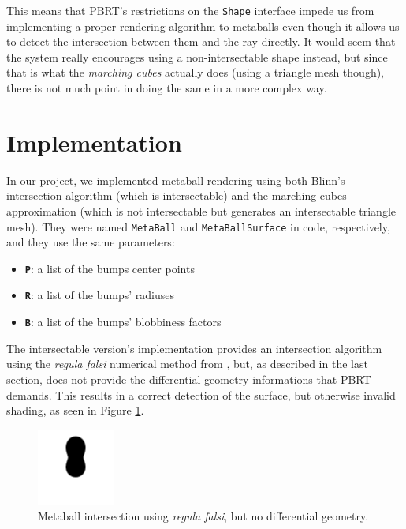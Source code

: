 \documentclass[conference]{acmsiggraph}
\begin{document}
This means that PBRT's restrictions on the \texttt{Shape} interface impede us
from implementing a proper rendering algorithm to metaballs even though it
allows us to detect the intersection between them and the ray directly. It would
seem that the system really encourages using a non-intersectable shape instead,
but since that is what the \textit{marching cubes} actually does (using a
triangle mesh though), there is not much point in doing the same in a more
complex way.

\section{Implementation}

In our project, we implemented metaball rendering using both Blinn's
intersection algorithm (which is intersectable) and the marching cubes
approximation (which is not intersectable but generates an intersectable 
triangle mesh). They were named \texttt{MetaBall} and \texttt{MetaBallSurface} 
in code, respectively, and they use the same parameters:

\begin{itemize}
  \item \textbf{\texttt{P}}: a list of the bumps center points
  \item \textbf{\texttt{R}}: a list of the bumps' radiuses
  \item \textbf{\texttt{B}}: a list of the bumps' blobbiness factors
\end{itemize}

The intersectable version's implementation provides an intersection algorithm
using the \textit{regula falsi} numerical method from
\cite{Blinn:1982:GAS:965145.801290}, but, as described in the last section, does
not provide the differential geometry informations that PBRT demands. This
results in a correct detection of the surface, but otherwise invalid shading, as
seen in Figure \ref{img:regula-falsi}.

\begin{figure}[ht]
  \centering
  \includegraphics[width=1in]{images/intersection-black.png}
  \caption{Metaball intersection using \textit{regula falsi}, but no differential geometry.}
  \label{img:regula-falsi}
\end{figure}
\end{document}
